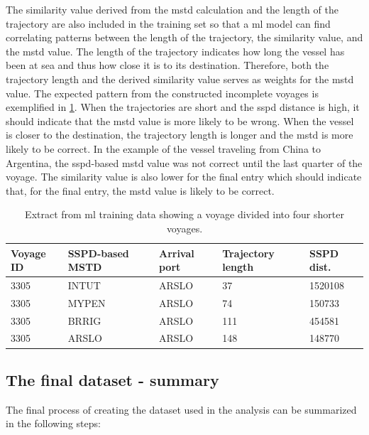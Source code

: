The similarity value derived from the \acrshort{mstd} calculation and the length of the trajectory are also included in the training set so that a \acrshort{ml} model can find correlating patterns between the length of the trajectory, the similarity value, and the \acrshort{mstd} value. The length of the trajectory indicates how long the vessel has been at sea and thus how close it is to its destination. Therefore, both the trajectory length and the derived similarity value serves as weights for the \acrshort{mstd} value. The expected pattern from the constructed incomplete voyages is exemplified in \cref{tab:incomplete_voyage}. When the trajectories are short and the \acrshort{sspd} distance is high, it should indicate that the \acrshort{mstd} value is more likely to be wrong. When the vessel is closer to the destination, the trajectory length is longer and the \acrshort{mstd} is more likely to be correct. In the example of the vessel traveling from China to Argentina, the \acrshort{sspd}-based \acrshort{mstd} value was not correct until the last quarter of the voyage. The similarity value is also lower for the final entry which should indicate that, for the final entry, the \acrshort{mstd} value is likely to be correct.

\begin{table}[htbp]
    \centering
    \small{\begin{tabularx}{0.9\textwidth}{X X X X X}
        \bfseries{Voyage ID} & \bfseries{SSPD-based MSTD} & \bfseries{Arrival port} & \bfseries{Trajectory length} & \bfseries{SSPD dist.} \\ \toprule
        3305 & INTUT & ARSLO & 37 & 1520108 \\ \midrule
        3305 & MYPEN & ARSLO & 74 & 150733 \\ \midrule
        3305 & BRRIG & ARSLO & 111 & 454581 \\ \midrule
        3305 & ARSLO & ARSLO & 148 & 148770 \\ \bottomrule
    \end{tabularx}}
\caption{Extract from ml training data showing a voyage divided into four shorter voyages.}\label{tab:incomplete_voyage}
\end{table}


\subsection{The final dataset - summary}

The final process of creating the dataset used in the analysis can be summarized in the following steps:


